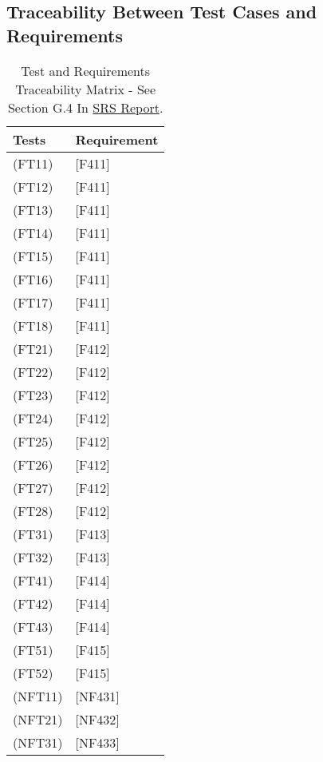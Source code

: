\documentclass[12pt, titlepage]{article}
\begin{document}
\subsection{Traceability Between Test Cases and Requirements}

\begin{table}[H]
  
  \centering
  \caption{Test and Requirements Traceability Matrix - See Section G.4 In \href{https://github.com/takhtart/PCD/blob/main/docs/SRS/SRS.pdf}{SRS Report}.}
  \begin{tabular}{|l|l|}
  \hline
  Tests   & Requirement \\
  \hline
  (FT11)  & {[}F411{]}  \\
  \hline
  (FT12)  & {[}F411{]}  \\
  \hline
  (FT13)  & {[}F411{]}  \\
  \hline
  (FT14)  & {[}F411{]}  \\
  \hline
  (FT15)  & {[}F411{]}  \\
  \hline
  (FT16)  & {[}F411{]}  \\
  \hline
  (FT17)  & {[}F411{]}  \\
  \hline
  (FT18)  & {[}F411{]}  \\
  \hline
  (FT21)  & {[}F412{]}  \\
  \hline
  (FT22)  & {[}F412{]}  \\
  \hline
  (FT23)  & {[}F412{]}  \\
  \hline
  (FT24)  & {[}F412{]}  \\
  \hline
  (FT25)  & {[}F412{]}  \\
  \hline
  (FT26)  & {[}F412{]}  \\
  \hline
  (FT27)  & {[}F412{]}  \\
  \hline
  (FT28)  & {[}F412{]}  \\
  \hline
  (FT31)  & {[}F413{]}  \\
  \hline
  (FT32)  & {[}F413{]}  \\
  \hline
  (FT41)  & {[}F414{]}  \\
  \hline
  (FT42)  & {[}F414{]}  \\
  \hline
  (FT43)  & {[}F414{]}  \\
  \hline
  (FT51)  & {[}F415{]}  \\
  \hline
  (FT52)  & {[}F415{]}  \\
  \hline
  (NFT11) & {[}NF431{]} \\
  \hline
  (NFT21) & {[}NF432{]} \\
  \hline
  (NFT31) & {[}NF433{]} \\ 
  \hline
  \end{tabular}
  \end{table}
\end{document}
